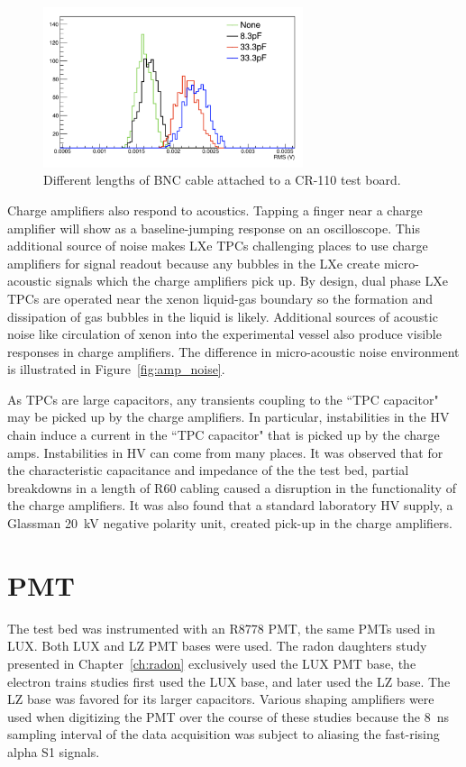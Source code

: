 \begin{figure}[htbp]
\begin{center}
\includegraphics[width=3in]{figures/testbed/rms.png}
\caption{Different lengths of BNC cable attached to a CR-110 test board.}
\label{fig:rms}
\end{center}
\end{figure}

Charge amplifiers also respond to acoustics. Tapping a finger near a charge amplifier will show as a baseline-jumping response on an oscilloscope. This additional source of noise makes \ac{LXe} \ac{TPC}s challenging places to use charge amplifiers for signal readout because any bubbles in the \ac{LXe} create micro-acoustic signals which the charge amplifiers pick up. By design, dual phase \ac{LXe} \ac{TPC}s are operated near the xenon liquid-gas boundary so the formation and dissipation of gas bubbles in the liquid is likely. Additional sources of acoustic noise like circulation of xenon into the experimental vessel also produce visible responses in charge amplifiers. The difference in micro-acoustic noise environment is illustrated in Figure~\ref{fig:amp_noise}.

As \ac{TPC}s are large capacitors, any transients coupling to the ``TPC capacitor" may be picked up by the charge amplifiers. In particular, instabilities in the \ac{HV} chain induce a current in the ``TPC capacitor" that is picked up by the charge amps. Instabilities in \ac{HV} can come from many places. It was observed that for the characteristic capacitance and impedance of the the test bed, partial breakdowns in a length of R60 cabling caused a disruption in the functionality of the charge amplifiers. It was also found that a standard laboratory \ac{HV} supply, a Glassman 20~kV negative polarity unit, created pick-up in the charge amplifiers.  

\section{PMT}
The test bed was instrumented with an R8778 PMT, the same PMTs used in LUX. Both LUX and LZ PMT bases were used. The radon daughters study presented in Chapter~\ref{ch:radon} exclusively used the LUX PMT base, the electron trains studies first used the LUX base, and later used the LZ base. The LZ base was favored for its larger capacitors. Various shaping amplifiers were used when digitizing the PMT over the course of these studies because the 8~ns sampling interval of the data acquisition was subject to aliasing the fast-rising alpha S1 signals.


